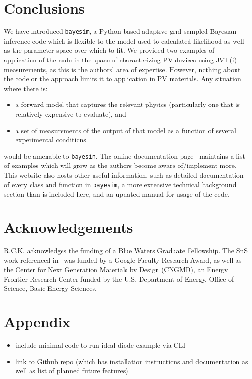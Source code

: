 \documentclass[aps,prl,amsmath,amssymb,superscriptaddress,notitlepage,groupedaddress]{revtex4-1}
\begin{document}
\section*{Conclusions}
 We have introduced \texttt{bayesim}, a Python-based adaptive grid sampled Bayesian inference code which is flexible to the model used to calculated likelihood as well as the parameter space over which to fit. We provided two examples of application of the code in the space of characterizing PV devices using JVT(i) measurements, as this is the authors' area of expertise. However, nothing about the code or the approach limits it to application in PV materials. Any situation where there is:
 \begin{itemize}
   \item a forward model that captures the relevant physics (particularly one that is relatively expensive to evaluate), and
   \item a set of measurements of the output of that model as a function of several experimental conditions
 \end{itemize}
 would be amenable to \texttt{bayesim}. The online documentation page~\cite{docs} maintains a list of examples which will grow as the authors become aware of/implement more. This website also hosts other useful information, such as detailed documentation of every class and function in \texttt{bayesim}, a more extensive technical background section than is included here, and an updated manual for usage of the code.

\section*{Acknowledgements}
R.C.K. acknowledges the funding of a Blue Waters Graduate Fellowship. The SnS work referenced in~\cite{SnSJoule} was funded by a Google Faculty Research Award, as well as the Center for Next Generation Materials by Design (CNGMD), an Energy Frontier Research Center funded by the U.S. Department of Energy, Office of Science, Basic Energy Sciences.

\section*{Appendix}
 \begin{itemize}
   \item include minimal code to run ideal diode example via CLI
   \item link to Github repo (which has installation instructions and documentation as well as list of planned future features)
  \end{itemize}



\end{document}
